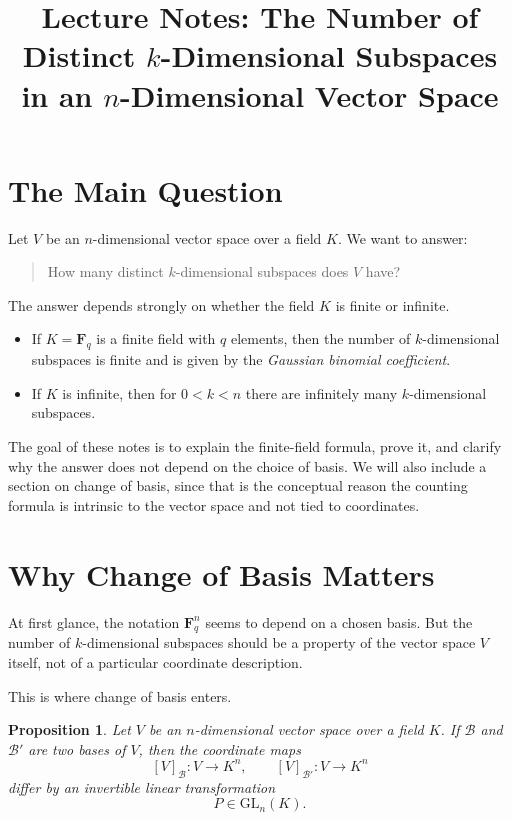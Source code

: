 \documentclass[11pt]{article}
\title{Lecture Notes: The Number of Distinct \(k\)-Dimensional Subspaces in an \(n\)-Dimensional Vector Space}
\author{}
\date{}
\newtheorem{proposition}[theorem]{Proposition}
\theoremstyle{definition}
\theoremstyle{remark}
\newcommand{\F}{\mathbf{F}}
\newcommand{\GL}{\mathrm{GL}}
\begin{document}
	
	\maketitle
	
	\tableofcontents
	
	\section{The Main Question}
	
	Let \(V\) be an \(n\)-dimensional vector space over a field \(K\). We want to answer:
	
	\begin{quote}
		How many distinct \(k\)-dimensional subspaces does \(V\) have?
	\end{quote}
	
	The answer depends strongly on whether the field \(K\) is finite or infinite.
	
	\begin{itemize}
		\item If \(K=\F_q\) is a finite field with \(q\) elements, then the number of \(k\)-dimensional subspaces is finite and is given by the \emph{Gaussian binomial coefficient}.
		\item If \(K\) is infinite, then for \(0<k<n\) there are infinitely many \(k\)-dimensional subspaces.
	\end{itemize}
	
	The goal of these notes is to explain the finite-field formula, prove it, and clarify why the answer does not depend on the choice of basis. We will also include a section on change of basis, since that is the conceptual reason the counting formula is intrinsic to the vector space and not tied to coordinates.
	
	\section{Why Change of Basis Matters}
	
	At first glance, the notation \(\F_q^n\) seems to depend on a chosen basis. But the number of \(k\)-dimensional subspaces should be a property of the vector space \(V\) itself, not of a particular coordinate description.
	
	This is where change of basis enters.
	
	\begin{proposition}
		Let \(V\) be an \(n\)-dimensional vector space over a field \(K\). If \(\mathcal{B}\) and \(\mathcal{B}'\) are two bases of \(V\), then the coordinate maps
		\[
		[V]_{\mathcal{B}} : V \to K^n,
		\qquad
		[V]_{\mathcal{B}'} : V \to K^n
		\]
		differ by an invertible linear transformation
		\[
		P \in \GL_n(K).
		\]
	\end{proposition}
	
\end{document}
